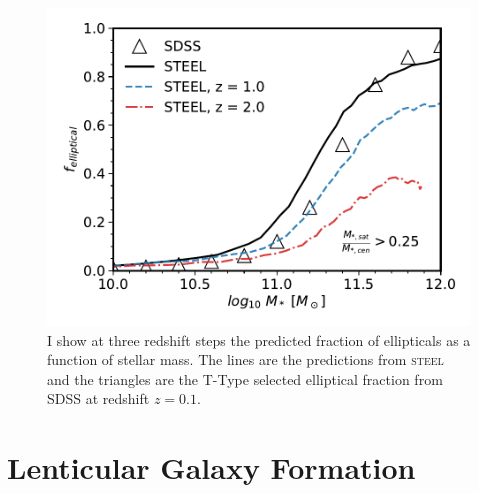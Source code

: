 \begin{figure}[h]
	\centering
	\includegraphics[width = \linewidth]{Figures/Chapter5/GalaxyMorphologies.pdf}
	\caption{I show at three redshift steps the predicted fraction of ellipticals as a function of stellar mass. The lines are the predictions from \textsc{steel} and the triangles are the T-Type selected elliptical fraction from SDSS at redshift $z = 0.1$.}
	\label{fig:Gal_Morph}
\end{figure}


\section{Lenticular Galaxy Formation}
